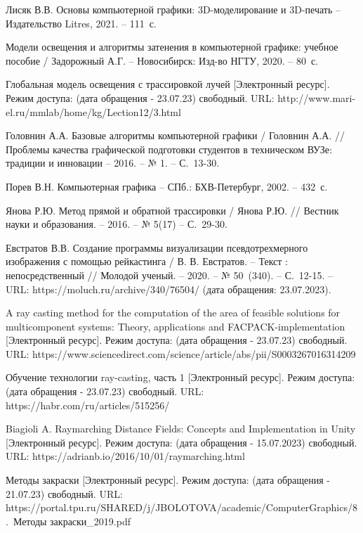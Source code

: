 
\renewcommand\bibname{СПИСОК ИСПОЛЬЗОВАННЫХ ИСТОЧНИКОВ} %
{}

\begin{thebibliography}{99}
    Лисяк В.В. Основы компьютерной графики: 3D-моделирование и 3D-печать -- Издательство Litres, 2021. -- 111~с.
    
    Модели освещения и алгоритмы затенения в компьютерной графике: учебное пособие / Задорожный А.Г. -- Новосибирск: Изд-во НГТУ, 2020. -- 80~с.
    
    Глобальная модель освещения с трассировкой лучей [Электронный ресурс]. Режим доступа: (дата обращения - 23.07.23) свободный. URL: http://www.mari-el.ru/mmlab/home/kg/Lection12/3.html
    
    Головнин А.А. Базовые алгоритмы компьютерной графики / Головнин А.А. // Проблемы качества графической подготовки студентов в техническом ВУЗе: традиции и инновации -- 2016. -- № 1. -- С.~13-30.

    Порев В.Н. Компьютерная графика -- СПб.: БХВ-Петербург, 2002. -- 432~с.
    
    Янова Р.Ю. Метод прямой и обратной трассировки / Янова Р.Ю. // Вестник науки и образования. -- 2016. -- № 5(17) -- С.~29-30.
    
    Евстратов В.В. Создание программы визуализации псевдотрехмерного изображения с помощью рейкастинга / В. В. Евстратов. -- Текст : непосредственный // Молодой ученый. -- 2020. -- № 50~(340). -- С.~12-15. -- URL: https://moluch.ru/archive/340/76504/ (дата обращения: 23.07.2023).

    A ray casting method for the computation of the area of feasible solutions for multicomponent systems: Theory, applications and FACPACK-implementation [Электронный ресурс]. Режим доступа: (дата обращения - 23.07.23) свободный. URL: https://www.sciencedirect.com/science/article/abs/pii/S0003267016314209 
    
    Обучение технологии ray-casting, часть 1 [Электронный ресурс]. Режим доступа: (дата обращения - 23.07.23) свободный. URL: https://habr.com/ru/articles/515256/

    Biagioli A. Raymarching Distance Fields: Concepts and Implementation in Unity [Электронный ресурс]. Режим доступа: (дата обращения - 15.07.2023) свободный. URL: https://adrianb.io/2016/10/01/raymarching.html

    Методы закраски [Электронный ресурс]. Режим доступа: (дата обращения - 21.07.23) свободный. URL: https://portal.tpu.ru/SHARED/j/JBOLOTOVA/academic/ComputerGra\-phics/8.~Методы закраски\_2019.pdf
    
\end{thebibliography}

{}

